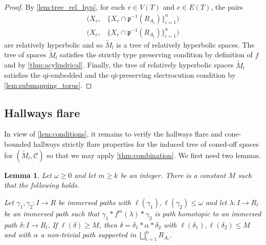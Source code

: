 \documentclass[11pt, a4paper]{amsart}
\newtheorem{lemma}[theorem]{Lemma}
\theoremstyle{definition}
\newcommand{\wt}[1]{\widetilde{ #1 }}
\DeclareMathOperator{\len}{\ell}
\begin{document}
\begin{proof}
By \cref{lem:tree_rel_hyp}, for each $v\in V(T)$ and $e\in E(T)$, the pairs
\begin{align*}
(X_v, &\{X_v\cap \mathfrak{p}^{-1}(R_{A_i})\}_{i=1}^n)\\
(X_e, &\{X_e\cap \mathfrak{p}^{-1}(R_{A_i})\}_{i=1}^n)
\end{align*}
are relatively hyperbolic and so $\wt{M}_l$ is a tree of relatively hyperbolic spaces. The tree of spaces $\wt{M}_l$ satisfies the strictly type preserving condition by definition of $f$ and by \cref{thm:acylindrical}. Finally, the tree of relatively hyperbolic spaces $\wt{M}_{l}$ satisfies the qi-embedded and the qi-preserving electrocution condition by \cref{lem:submapping_torus}.
\end{proof}


\subsection{Hallways flare}

In view of \cref{lem:conditions}, it remains to verify the hallways flare and cone-bounded hallways strictly flare properties for the induced tree of coned-off spaces for $(\wt{M}_{l}, \mathcal{C})$ so that we may apply \cref{thm:combination}. We first need two lemmas.


\begin{lemma}
\label{lem:iteration_general}
Let $\omega\geqslant 0$ and let $m\geqslant k$ be an integer. There is a constant $M$ such that the following holds. 

Let $\gamma_1, \gamma_2\colon I \to R$ be immersed paths with $\len(\gamma_1), \len(\gamma_2)\leqslant \omega$ and let $\lambda\colon I\to R_{l}$ be an immersed path such that $\gamma_1*f^m(\lambda)*\gamma_2$ is path homotopic to an immersed path $\delta\colon I\to R_{l}$. If $\len(\delta)\geqslant M$, then $\delta = \delta_1*\alpha*\delta_2$ with $\len(\delta_1), \len(\delta_2)\leqslant M$ and with $\alpha$ a non-trivial path supported in $\bigsqcup_{i=1}^nR_{A_i}$.
\end{lemma}
\end{document}

